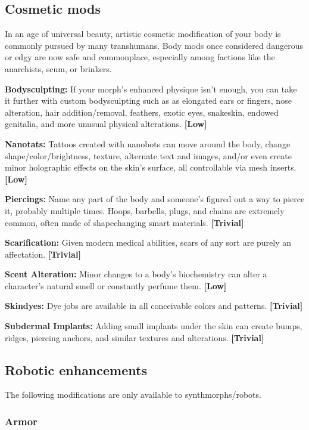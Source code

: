 \subsection{Cosmetic mods}
\label{sec:cosmetic-mods}

In an age of universal beauty, artistic cosmetic modification of your body is commonly pursued by many transhumans. Body mods once considered dangerous or edgy are now safe and commonplace, especially among factions like the anarchists, scum, or brinkers.

\textbf{Bodysculpting:} If your morph’s enhanced physique isn’t enough, you can take it further with custom bodysculpting such as as elongated ears or fingers, nose alteration, hair addition/removal, feathers, exotic eyes, snakeskin, endowed genitalia, and more unusual physical alterations. \textbf{[Low]}

\textbf{Nanotats:} Tattoos created with nanobots can move around the body, change shape/color/brightness, texture, alternate text and images, and/or even create minor holographic effects on the skin’s surface, all controllable via mesh inserts. \textbf{[Low]}

\textbf{Piercings:} Name any part of the body and someone’s figured out a way to pierce it, probably multiple times. Hoops, barbells, plugs, and chains are extremely common, often made of shapechanging smart materials. \textbf{[Trivial]}

\textbf{Scarification:} Given modern medical abilities, scars of any sort are purely an affectation. \textbf{[Trivial]}

\textbf{Scent Alteration:} Minor changes to a body’s biochemistry can alter a character’s natural smell or constantly perfume them. \textbf{[Low]}

\textbf{Skindyes:} Dye jobs are available in all conceivable colors and patterns. \textbf{[Trivial]}

\textbf{Subdermal Implants:} Adding small implants under the skin can create bumps, ridges, piercing anchors, and similar textures and alterations. \textbf{[Trivial]}


\subsection{Robotic enhancements}
\label{sec:robotic-enhancements}

The following modifications are only available to synthmorphs/robots.

\subsubsection{Armor}

